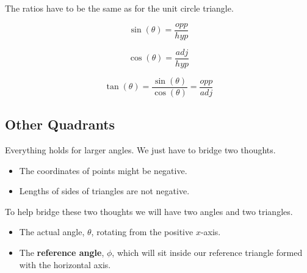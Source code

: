 \documentclass{ximera}
\begin{document}
\begin{image}[3in]
  \end{image}


The ratios have to be the same as for the unit circle triangle.


\[   \sin(\theta) = \frac{opp}{hyp}           \]



\[   \cos(\theta) = \frac{adj}{hyp}           \]




\[   \tan(\theta) = \frac{\sin(\theta)}{\cos(\theta)}    = \frac{opp}{adj}        \]








\subsection*{Other Quadrants}


Everything holds for larger angles.  We just have to bridge two thoughts.  


\begin{itemize}
\item The coordinates of points might be negative.  
\item Lengths of sides of triangles are not negative.
\end{itemize}

To help bridge these two thoughts we will have two angles and two triangles.  


\begin{itemize}
\item The actual angle, $\theta$, rotating from the positive $x$-axis.  
\item The \textbf{reference angle}, $\phi$, which will sit inside our reference triangle formed with the horizontal axis.
\end{itemize}
\end{document}
